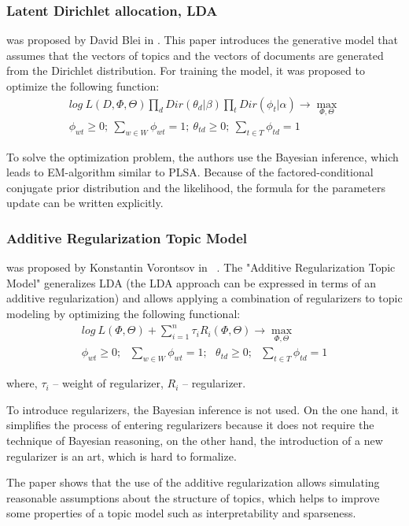 \documentclass[runningheads,a4paper]{llncs}
\begin{document}
	\subsubsection{Latent Dirichlet allocation, LDA} was proposed by David Blei in \cite{blei2003latent}. This paper introduces the generative model that assumes that the vectors of topics and the vectors of documents are generated from the Dirichlet distribution. For training the model, it was proposed to optimize the following function:
\begin{align}
	log~L(D, \Phi, \Theta) \prod_{d} Dir(\theta_d| \beta) \prod_{t} Dir(\phi_t| \alpha) \rightarrow \max_{\Phi, \Theta}\\
    	\phi_{wt} \geq 0;~\sum_{w \in W} \phi_{wt} = 1;~\theta_{td} \geq 0;~\sum_{t \in T} \phi_{td} = 1 
\end{align}

To solve the optimization problem, the authors use the  Bayesian inference, which leads to EM-algorithm similar to PLSA. Because of the factored-conditional conjugate prior distribution and the likelihood, the formula for the parameters update can be written explicitly.
  
	\subsubsection{Additive Regularization Topic Model} was proposed by Konstantin Vorontsov in ~\cite{vorontsov2014additive}. The "Additive Regularization Topic Model" generalizes LDA (the LDA approach can be expressed in terms of an additive regularization) and allows applying a combination of regularizers to topic modeling by optimizing the following functional:
\begin{align}log~L(\Phi, \Theta) + \sum_{i=1}^{n} \tau_i R_i(\Phi, \Theta) \rightarrow \max_{\Phi,\Theta}~~~~~~~~~~\\
\phi_{wt} \geq 0;~~~\sum_{w \in W} \phi_{wt} = 1;~~~\theta_{td} \geq 0;~~~\sum_{t \in T} \phi_{td} = 1\end{align}
	
	\noindent where, $\tau_i$ -- weight of regularizer, $R_i$ -- regularizer. 
	
	To introduce regularizers, the Bayesian inference is not used. On the one hand, it simplifies the process of entering regularizers because it does not require the technique of Bayesian reasoning, on the other hand, the introduction of a new regularizer is an art, which is hard to formalize.

	The paper \cite{vorontsov2014additive} shows that the use of the additive regularization allows simulating reasonable assumptions about the structure of topics, which helps to improve some properties of a topic model such as interpretability and sparseness.
	
\end{document}
